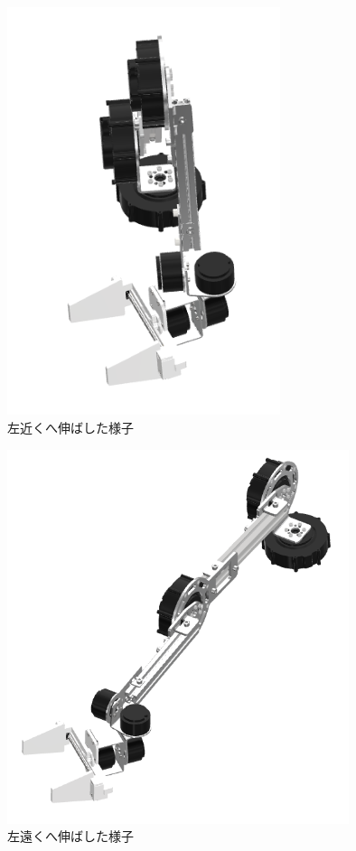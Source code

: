 \begin{figure}[h]
  \centering
  \includegraphics[width=8cm]{images/design/hidaritika.png}
  \caption{左近くへ伸ばした様子}
  \label{fig:move3}
\end{figure}

\begin{figure}[h]
  \centering
  \includegraphics[width=10cm]{images/design/hidarioku.png}
  \caption{左遠くへ伸ばした様子}
  \label{fig:move4}
\end{figure}
\clearpage

